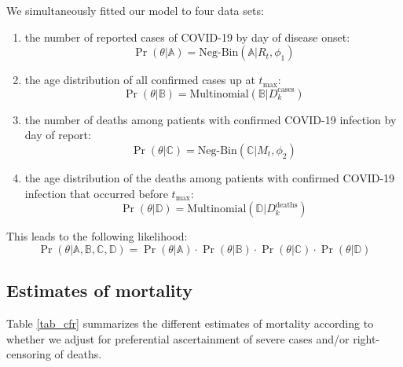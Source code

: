 \documentclass{article}
\begin{document}
We simultaneously fitted our model to four data sets: 
	\begin{enumerate}
		\item the number of reported cases of COVID-19 by day of disease onset:
		\begin{equation}
		\Pr(\theta| \mathds{A}) = \text{Neg-Bin}(\mathds{A}| R_t,\phi_1)
		\end{equation}
		
		\item the age distribution of all confirmed cases up at $t_{\text{max}}$:
		\begin{equation}
		\Pr(\theta| \mathds{B}) = \text{Multinomial}(\mathds{B}|D_k^{\text{cases}})
		\end{equation}
		
		\item the number of deaths among patients with confirmed COVID-19 infection by day of report:
		\begin{equation}
		\Pr(\theta| \mathds{C}) = \text{Neg-Bin}(\mathds{C}|M_t,\phi_2)
		\end{equation}
		
		\item the age distribution of the deaths among patients with confirmed COVID-19 infection that occurred before $t_{\text{max}}$:
		\begin{equation}
		\Pr(\theta| \mathds{D}) = \text{Multinomial}(\mathds{D}|D_k^{\text{deaths}})
		\end{equation}
	\end{enumerate}
	This leads to the following likelihood:
	\begin{equation}
	\Pr(\theta | \mathds{A},\mathds{B},\mathds{C},\mathds{D}) = \Pr(\theta| \mathds{A}) \cdot \Pr(\theta| \mathds{B}) \cdot \Pr(\theta| \mathds{C}) \cdot \Pr(\theta| \mathds{D})
	\end{equation}
	
\subsection{Estimates of mortality}
Table \ref{tab_cfr} summarizes the different estimates of mortality according to whether we adjust for preferential ascertainment of severe cases and/or right-censoring of deaths.
\end{document}
